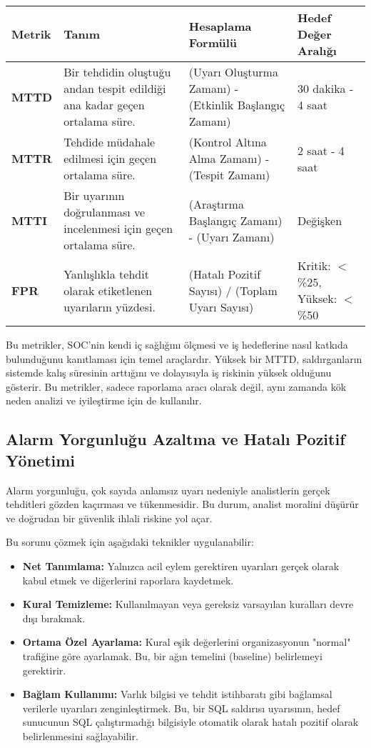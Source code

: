 \begin{longtable}{|p{2.5cm}|p{3cm}|p{3cm}|p{3.5cm}|}
\hline
\textbf{Metrik} & \textbf{Tanım} & \textbf{Hesaplama Formülü} & \textbf{Hedef Değer Aralığı} \\
\hline
\textbf{MTTD} & Bir tehdidin oluştuğu andan tespit edildiği ana kadar geçen ortalama süre. & (Uyarı Oluşturma Zamanı) - (Etkinlik Başlangıç Zamanı) & 30 dakika - 4 saat \\
\hline
\textbf{MTTR} & Tehdide müdahale edilmesi için geçen ortalama süre. & (Kontrol Altına Alma Zamanı) - (Tespit Zamanı) & 2 saat - 4 saat \\
\hline
\textbf{MTTI} & Bir uyarının doğrulanması ve incelenmesi için geçen ortalama süre. & (Araştırma Başlangıç Zamanı) - (Uyarı Zamanı) & Değişken \\
\hline
\textbf{FPR} & Yanlışlıkla tehdit olarak etiketlenen uyarıların yüzdesi. & (Hatalı Pozitif Sayısı) / (Toplam Uyarı Sayısı) & Kritik: $<$\%25, Yüksek: $<$\%50 \\
\hline
\end{longtable}

Bu metrikler, SOC'nin kendi iç sağlığını ölçmesi ve iş hedeflerine nasıl katkıda bulunduğunu kanıtlaması için temel araçlardır. Yüksek bir MTTD, saldırganların sistemde kalış süresinin arttığını ve dolayısıyla iş riskinin yüksek olduğunu gösterir. Bu metrikler, sadece raporlama aracı olarak değil, aynı zamanda kök neden analizi ve iyileştirme için de kullanılır.

\subsection{Alarm Yorgunluğu Azaltma ve Hatalı Pozitif Yönetimi}

Alarm yorgunluğu, çok sayıda anlamsız uyarı nedeniyle analistlerin gerçek tehditleri gözden kaçırması ve tükenmesidir. Bu durum, analist moralini düşürür ve doğrudan bir güvenlik ihlali riskine yol açar.

Bu sorunu çözmek için aşağıdaki teknikler uygulanabilir:
\begin{itemize}
    \item \textbf{Net Tanımlama:} Yalnızca acil eylem gerektiren uyarıları gerçek olarak kabul etmek ve diğerlerini raporlara kaydetmek.
    \item \textbf{Kural Temizleme:} Kullanılmayan veya gereksiz varsayılan kuralları devre dışı bırakmak.
    \item \textbf{Ortama Özel Ayarlama:} Kural eşik değerlerini organizasyonun "normal" trafiğine göre ayarlamak. Bu, bir ağın temelini (baseline) belirlemeyi gerektirir.
    \item \textbf{Bağlam Kullanımı:} Varlık bilgisi ve tehdit istihbaratı gibi bağlamsal verilerle uyarıları zenginleştirmek. Bu, bir SQL saldırısı uyarısının, hedef sunucunun SQL çalıştırmadığı bilgisiyle otomatik olarak hatalı pozitif olarak belirlenmesini sağlayabilir.
\end{itemize}

